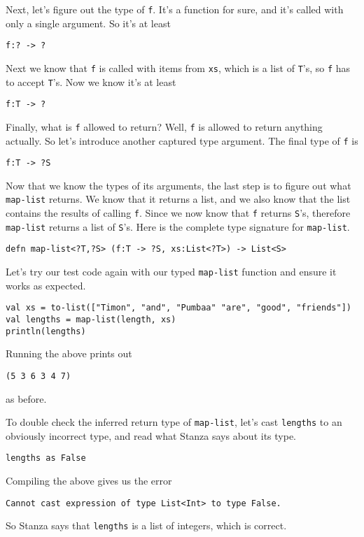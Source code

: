 \documentclass[10pt,oneside]{book}
\begin{document}
Next, let's figure out the type of \texttt{\frenchspacing f}. It's a function for sure, and it's called with only a single argument. So it's at least
\begin{lstlisting}
f:? -> ?
\end{lstlisting}
Next we know that \texttt{\frenchspacing f} is called with items from \texttt{\frenchspacing xs}, which is a list of \texttt{\frenchspacing T}'s, so \texttt{\frenchspacing f} has to accept \texttt{\frenchspacing T}'s. Now we know it's at least
\begin{lstlisting}
f:T -> ?
\end{lstlisting}
Finally, what is \texttt{\frenchspacing f} allowed to return? Well, \texttt{\frenchspacing f} is allowed to return anything actually. So let's introduce another captured type argument. The final type of \texttt{\frenchspacing f} is
\begin{lstlisting}
f:T -> ?S
\end{lstlisting}

Now that we know the types of its arguments, the last step is to figure out what \texttt{\frenchspacing map-list} returns. We know that it returns a list, and we also know that the list contains the results of calling \texttt{\frenchspacing f}. Since we now know that \texttt{\frenchspacing f} returns \texttt{\frenchspacing S}'s, therefore \texttt{\frenchspacing map-list} returns a list of \texttt{\frenchspacing S}'s. Here is the complete type signature for \texttt{\frenchspacing map-list}.
\begin{lstlisting}
defn map-list<?T,?S> (f:T -> ?S, xs:List<?T>) -> List<S>
\end{lstlisting}

Let's try our test code again with our typed \texttt{\frenchspacing map-list} function and ensure it works as expected.
\begin{lstlisting}
val xs = to-list(["Timon", "and", "Pumbaa" "are", "good", "friends"])
val lengths = map-list(length, xs)
println(lengths)
\end{lstlisting}
Running the above prints out
\begin{lstlisting}
(5 3 6 3 4 7)
\end{lstlisting}
as before. 

To double check the inferred return type of \texttt{\frenchspacing map-list}, let's cast \texttt{\frenchspacing lengths} to an obviously incorrect type, and read what Stanza says about its type. 
\begin{lstlisting}
lengths as False
\end{lstlisting}
Compiling the above gives us the error
\begin{lstlisting}
Cannot cast expression of type List<Int> to type False.
\end{lstlisting}
So Stanza says that \texttt{\frenchspacing lengths} is a list of integers, which is correct. 
\end{document}
